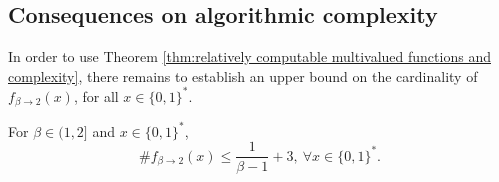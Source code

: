 \subsection{Consequences on algorithmic complexity}


In order to use Theorem \ref{thm:relatively computable multivalued functions and complexity}, there remains to establish an upper bound on the cardinality of $f_{\beta \to 2}(x)$, for all $x \in \{0,1\}^\ast$.
\begin{lemma}\label{lem:upper bound on the cardinality of the beta to 2 conversion multifunction}
    For $\beta \in (1,2]$ and $x \in \{0,1\}^\ast$,
    \begin{equation}
        \#f_{\beta \to 2}(x) \leq \frac{1}{\beta-1} + 3, \ \forall x \in \{0,1\}^\ast.
    \end{equation}
\end{lemma}
